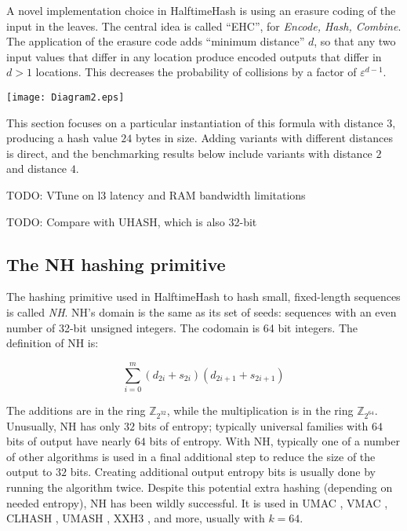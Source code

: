 \documentclass[sigconf, nonacm]{acmart}
\newcommand{\ints}{\mathbb{Z}}
\begin{document}
A novel implementation choice in HalftimeHash is using an erasure coding of the input in the leaves.
The central idea is called ``EHC'', for {\em Encode, Hash, Combine}. \cite{ehc-nandi}
The application of the erasure code adds ``minimum distance'' $d$, so that any two input values that differ in any location produce encoded outputs that differ in $d > 1$ locations.
This decreases the probability of collisions by a factor of $\varepsilon^{d-1}$.

\texttt{[image: Diagram2.eps]}

This section focuses on a particular instantiation of this formula with distance $3$, producing a hash value $24$ bytes in size.
Adding variants with different distances is direct, and the benchmarking results below include variants with distance $2$ and distance $4$.

TODO: VTune on l3 latency and RAM bandwidth limitations

 TODO: Compare with UHASH, which is also 32-bit

\subsection{The NH hashing primitive}

The hashing primitive used in HalftimeHash to hash small, fixed-length sequences is called {\em NH}. \cite{umac}
NH's domain is the same as its set of seeds: sequences with an even number of 32-bit unsigned integers.
The codomain is 64 bit integers.
The definition of NH is:

$$\sum_{i=0}^m (d_{2i} + s_{2i})(d_{2i+1} + s_{2i+1})$$

The additions are in the ring $\ints_{2^{32}}$, while the multiplication is in the ring $\ints_{2^{64}}$.
Unusually, NH has only $32$ bits of entropy; typically universal families with $64$ bits of output have nearly $64$ bits of entropy. \cite{umash,clhash}
With NH, typically one of a number of other algorithms is used in a final additional step to reduce the size of the output to $32$ bits.
Creating additional output entropy bits is usually done by running the algorithm twice. \cite{umash,umac}
Despite this potential extra hashing (depending on needed entropy), NH has been wildly successful.
It is used in UMAC \cite{umac}, VMAC \cite{vmac}, CLHASH \cite{clhash}, UMASH \cite{umash}, XXH3 \cite{xxh3}, and more, usually with $k = 64$.
\end{document}
